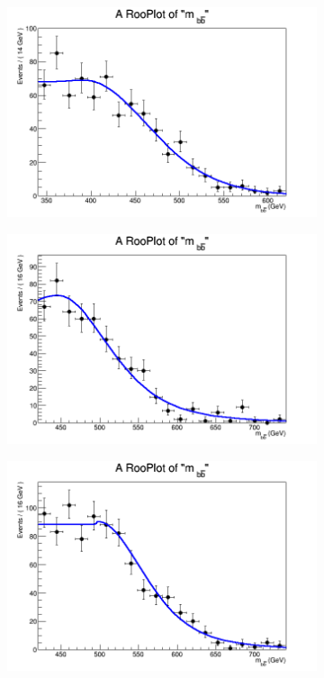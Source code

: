 \begin{figure}[phtb!]
\begin{center}
  \begin{subfigure}[$m_{A}=500$ GeV]{0.4\textwidth}\includegraphics[width=\textwidth]{FitResults/images/fitMC_bAbb500_6.png}\end{subfigure}
  \begin{subfigure}[$m_{A}=550$ GeV]{0.4\textwidth}\includegraphics[width=\textwidth]{FitResults/images/fitMC_bAbb550_6.png}\end{subfigure}
  \begin{subfigure}[$m_{A}=600$ GeV]{0.4\textwidth}\includegraphics[width=\textwidth]{FitResults/images/fitMC_bAbb600_6.png}\end{subfigure}

\end{center}
\end{figure}
